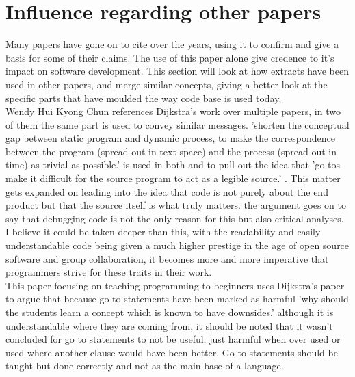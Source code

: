 \documentclass{scrartcl}
\begin{document}
\section{Influence regarding other papers}
Many papers have gone on to cite \cite{dijkstra2002go} over the years, using it to confirm and give a basis for some of their claims. The use of this paper alone give credence to it's impact on software development. This section will look at how extracts have been used in other papers, and merge similar concepts, giving a better look at the specific parts that have moulded the way code base is used today.\\ Wendy Hui Kyong Chun references Dijkstra's work over multiple papers, in two of them the same part is used to convey similar messages.  'shorten the conceptual gap between static program and dynamic process, to make the correspondence between the program (spread out in text space) and the process (spread out in time) as trivial as possible.' \cite[p.137]{dijkstra2002go} is used in both \cite{chun2005software} and \cite{chun2008sourcery} to pull out the idea that 'go tos make it difficult for the source program to
act as a legible source.' \cite[p.303]{chun2008sourcery}. This matter gets expanded on leading into the idea that code is not purely about the end product but that the source itself is what truly matters. the argument goes on to say that debugging code is not the only reason for this but also critical analyses. I believe it could be taken deeper than this, with the readability and easily understandable code being given a much higher prestige in the age of open source software and group collaboration, it becomes more and more imperative that programmers strive for these traits in their work.\\
This paper \cite{huch2007learning} focusing on teaching programming  to beginners uses Dijkstra's paper to argue that because go to statements have been marked as harmful 'why should the students learn a concept which is known to have downsides.' \cite[p.94]{huch2007learning} although it is understandable where they are coming from, it should be noted that it wasn't concluded for go to statements to not be useful, just harmful when over used or used where another clause would have been better. Go to statements should be taught but done correctly and not as the main base of a language.



\end{document}
